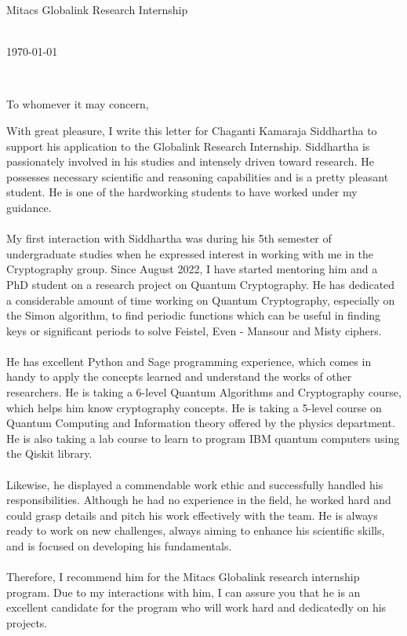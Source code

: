 \documentclass[11pt,a4paper]{letter} %
\def\opening#1{\thispagestyle{empty}
{\centering\fromaddress \vspace{0.6in} \\ %
\hspace*{0.8\longindentation}\today\hspace*{\fill}\par} %
{\raggedright \toname \\ \toaddress \par} %
\vspace{0.4in} %
\noindent #1 %
}
\begin{document}

\begin{letter}
{
Mitacs Globalink Research Internship
}


\opening{To whomever it may concern,}

With great pleasure, I write this letter for Chaganti Kamaraja Siddhartha to support his application to the Globalink Research Internship. Siddhartha is passionately involved in his studies and intensely driven toward research. He possesses necessary scientific and reasoning capabilities and is a pretty pleasant student. He is one of the hardworking students to have worked under my guidance. \\ \\
My first interaction with Siddhartha was during his 5th semester of undergraduate studies when he expressed interest in working with me in the Cryptography group. Since August 2022, I have started mentoring him and a PhD student on a research project on Quantum Cryptography. He has dedicated a considerable amount of time working on Quantum Cryptography, especially on the Simon algorithm, to find periodic functions which can be useful in finding keys or significant periods to solve Feistel, Even - Mansour and Misty ciphers. \\ \\
He has excellent Python and Sage programming experience, which comes in handy to apply the concepts learned and understand the works of other researchers. He is taking a 6-level Quantum Algorithms and Cryptography course, which helps him know cryptography concepts. He is taking a 5-level course on Quantum Computing and Information theory offered by the physics department. He is also taking a lab course to learn to program IBM quantum computers using the Qiskit library. \\\\
Likewise, he displayed a commendable work ethic and successfully handled his responsibilities. Although he had no experience in the field, he worked hard and could grasp details and pitch his work effectively with the team. He is always ready to work on new challenges, always aiming to enhance his scientific skills, and is focused on developing his fundamentals. \\ \\
Therefore, I recommend him for the Mitacs Globalink research internship program. Due to my interactions with him, I can assure you that he is an excellent candidate for the program who will work hard and dedicatedly on his projects. 


\end{letter}
\end{document}
